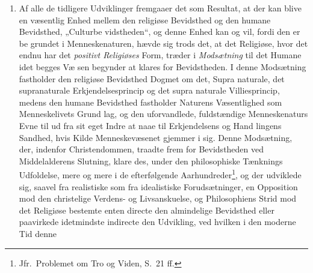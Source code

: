  \setcounter{footnote}{0}%
\begin{enumerate}[label=\arabic*., leftmargin=*, labelsep=1em,
                  topsep=0.35\baselineskip, itemsep=0.35\baselineskip]
\item Af alle de tidligere Udviklinger fremgaaer det som Resultat, at der kan
  blive en væsentlig Enhed mellem den religiøse Bevidsthed og den humane
  Bevidsthed, „Culturbe\-%
vidstheden“, og denne Enhed kan og vil, fordi den er be\-%
grundet i Menneskenaturen, hævde sig trods det, at det Religiøse, hvor det endnu
  har det \emph{positivt Religiøses} Form, træder i \emph{Modsætning} til det
  Humane idet begges Væ\-%
sen begynder at klares for Bevidstheden. I denne Modsætning fastholder den
  religiøse Bevidsthed Dogmet om det, Supra\-%
naturale, det supranaturale Erkjendelsesprincip og det supra\-%
naturale Villiesprincip, medens den humane Bevidsthed fastholder Naturens
  Væsentlighed som Menneskelivets Grund\-%
lag, og den uforvandlede, fuldstændige Menneskenaturs Evne til ud fra sit eget
  Indre at naae til Erkjendelsens og Hand\-%
lingens Sandhed, hvis Kilde Menneskevæsenet gjemmer i sig. Denne Modsætning,
  der, indenfor Christendommen, traadte frem for Bevidstheden ved Middelalderens
  Slutning, klare\-%
des, under den philosophiske Tænknings Udfoldelse, mere og mere i de
  efterfølgende Aarhundreder\footnote{Jfr.\ Problemet om Tro og Viden, S.\ 21
  ff.}, og der udviklede sig, saavel fra realistiske som fra idealistiske
  Forudsætninger, en Opposition mod den christelige Verdens- og Livsanskuelse, og
  Philosophiens Strid mod det Religiøse bestemte enten directe den almindelige
  Bevidsthed eller paavirkede idetmindste indirecte den Udvikling, ved hvilken i
  den moderne Tid denne

\end{enumerate}
